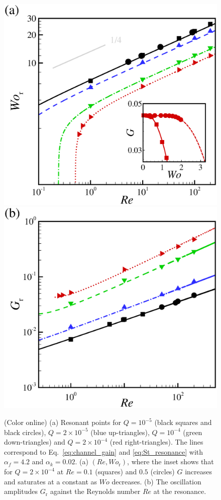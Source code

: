 \documentclass[aps,prl,reprint,superscriptaddress,floatfix]{revtex4-1}
\newcommand{\Rey}{\mathit{Re}}
\newcommand{\Wo}{\mathit{Wo}}
\begin{document}
\begin{figure}
	\centering	
	\includegraphics[width=0.49\linewidth, trim={0.25cm 0cm 1.5cm 1cm}, clip]{./epsFig/fig5_sub_a.eps}
	\includegraphics[width=0.49\linewidth, trim={0.25cm 0cm 1.5cm 1cm}, clip]{./epsFig/fig5b.eps}
	\caption{\label{fig:Str_Rer_Q} (Color online)  (a) Resonant points for $Q=10^{-5}$ (black squares and black circles), $Q=2 \times 10^{-5}$ (blue up-triangles), $Q=10^{-4}$ (green down-triangles) and $Q=2\times10^{-4}$ (red right-triangles). The lines correspond to Eq.~\ref{eq:channel_gain} and \ref{eq:St_resonance} with $\alpha_f=4.2$ and $\alpha_k=0.02$. (a) $(\Rey, \Wo_\text{r})$, where the inset shows that for $Q=2\times10^{-4}$ at $\Rey=0.1$ (squares) and $0.5$ (circles) $G$ increases and saturates at a constant as $\Wo$ decreases. (b) The oscillation amplitudes $G_\text{r}$ against the Reynolds number $\Rey$ at the resonance.}
\end{figure}
\end{document}
